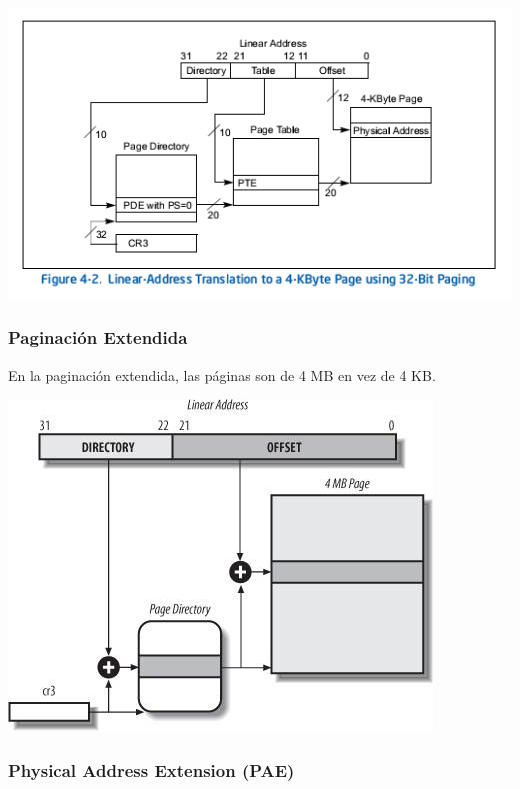 \begin{center}
\includegraphics[scale=0.6]{./Graficos/linear_address_translation.png} 
\end{center}

\newpage
\subsubsection{Paginaci\'on Extendida}

En la paginaci\'on extendida, las p\'aginas son de 4 MB en vez de 4 KB.

\begin{center}
\includegraphics[scale=0.6]{./Graficos/extended_paging.jpg} 
\end{center}


\subsubsection{Physical Address Extension (PAE)}

